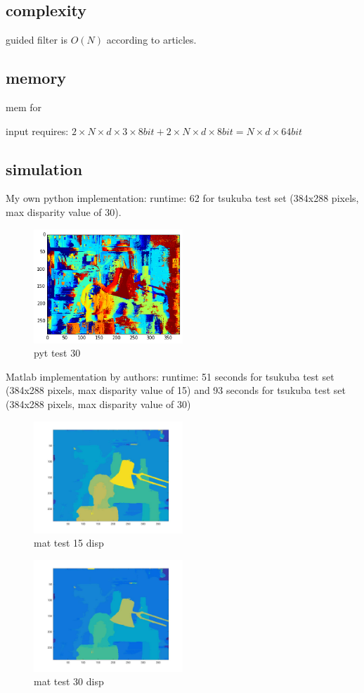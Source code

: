 \subsection*{complexity}

guided filter is $O(N)$ according to articles.

\subsection*{memory}
mem for 

input requires: $2 \times N \times d \times 3 \times 8bit + 2 \times N \times d \times 8bit = N \times d \times 64 bit$ \\
\subsection*{simulation}
My own python implementation: runtime: 62 for tsukuba test set (384x288 pixels, max disparity value of 30).

\begin{figure}
  \centering
  \includegraphics[width=0.5\textwidth]{images/test2.png}
  \caption{pyt test 30}
  \label{fig:my}
\end{figure}

Matlab implementation by authors: runtime: 51 seconds for tsukuba test set (384x288 pixels, max disparity value of 15) and 93 seconds for tsukuba test set (384x288 pixels, max disparity value of 30)

\begin{figure}
  \centering
  \includegraphics[width=0.5\textwidth]{images/matlabtest.jpg}
  \caption{mat test 15 disp}
  \label{fig:da}
\end{figure}

\begin{figure}
  \centering
  \includegraphics[width=0.5\textwidth]{images/mat2.jpg}
  \caption{mat test 30 disp}
  \label{fig:da2}
\end{figure}

